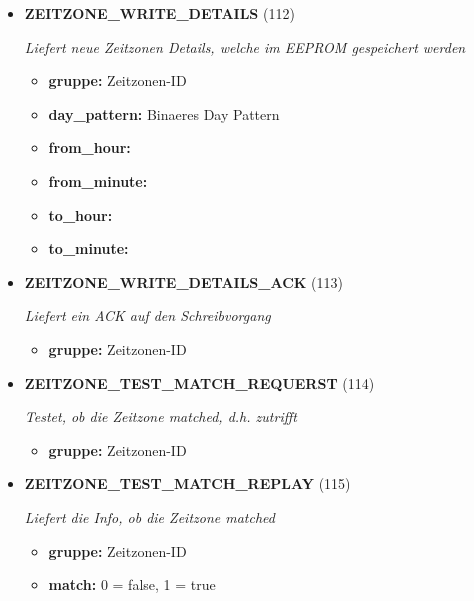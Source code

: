\begin{itemize}
\item \textbf{ZEITZONE\_WRITE\_DETAILS} (112)

\textit{Liefert neue Zeitzonen Details, welche im EEPROM gespeichert werden}

\small
\begin{itemize}
		
\item \textbf{gruppe:} Zeitzonen-ID
\item \textbf{day\_pattern:} Binaeres Day Pattern
\item \textbf{from\_hour:} 
\item \textbf{from\_minute:} 
\item \textbf{to\_hour:} 
\item \textbf{to\_minute:} 
\end{itemize}
\normalsize
	
\item \textbf{ZEITZONE\_WRITE\_DETAILS\_ACK} (113)

\textit{Liefert ein ACK auf den Schreibvorgang}

\small
\begin{itemize}
		
\item \textbf{gruppe:} Zeitzonen-ID
\end{itemize}
\normalsize
	
\item \textbf{ZEITZONE\_TEST\_MATCH\_REQUERST} (114)

\textit{Testet, ob die Zeitzone matched, d.h. zutrifft}

\small
\begin{itemize}
		
\item \textbf{gruppe:} Zeitzonen-ID
\end{itemize}
\normalsize
	
\item \textbf{ZEITZONE\_TEST\_MATCH\_REPLAY} (115)

\textit{Liefert die Info, ob die Zeitzone matched}

\small
\begin{itemize}
		
\item \textbf{gruppe:} Zeitzonen-ID
\item \textbf{match:} 0 = false, 1 = true
\end{itemize}
\normalsize
	
\end{itemize}
	

